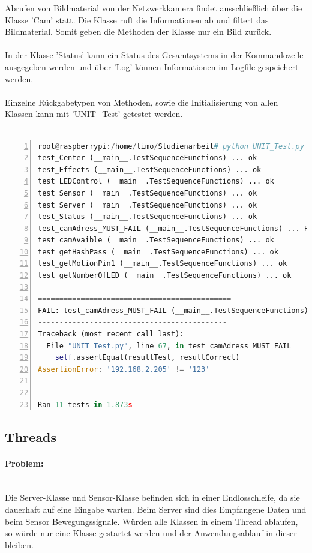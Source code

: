 Abrufen von Bildmaterial von der Netzwerkkamera findet ausschließlich über die Klasse 'Cam' statt. Die Klasse ruft die Informationen ab und filtert das Bildmaterial. Somit geben die Methoden der Klasse nur ein Bild zurück. \\\\
In der Klasse 'Status' kann ein Status des Gesamtsystems in der Kommandozeile ausgegeben werden und über 'Log' können Informationen im Logfile gespeichert werden. \\\\
Einzelne Rückgabetypen von Methoden, sowie die Initialisierung von allen Klassen kann mit 'UNIT\_Test' getestet werden. \\\\

\begin{lstlisting}[caption=Ausgabe der Klasse UNIT\_Test, language=python, frame=single, breaklines=true,columns=fullflexible, commentstyle=\color{gray}\upshape, captionpos=b, numbers = left]
root@raspberrypi:/home/timo/Studienarbeit# python UNIT_Test.py 
test_Center (__main__.TestSequenceFunctions) ... ok
test_Effects (__main__.TestSequenceFunctions) ... ok
test_LEDControl (__main__.TestSequenceFunctions) ... ok
test_Sensor (__main__.TestSequenceFunctions) ... ok
test_Server (__main__.TestSequenceFunctions) ... ok
test_Status (__main__.TestSequenceFunctions) ... ok
test_camAdress_MUST_FAIL (__main__.TestSequenceFunctions) ... FAIL
test_camAvaible (__main__.TestSequenceFunctions) ... ok
test_getHashPass (__main__.TestSequenceFunctions) ... ok
test_getMotionPin1 (__main__.TestSequenceFunctions) ... ok
test_getNumberOfLED (__main__.TestSequenceFunctions) ... ok

=============================================
FAIL: test_camAdress_MUST_FAIL (__main__.TestSequenceFunctions)
--------------------------------------------
Traceback (most recent call last):
  File "UNIT_Test.py", line 67, in test_camAdress_MUST_FAIL
    self.assertEqual(resultTest, resultCorrect)
AssertionError: '192.168.2.205' != '123'

--------------------------------------------
Ran 11 tests in 1.873s
\end{lstlisting}
\subsection{Threads}
\paragraph{Problem:} \\ Die Server-Klasse und Sensor-Klasse befinden sich in einer Endlosschleife, da sie dauerhaft auf eine Eingabe warten. Beim Server sind dies Empfangene Daten und beim Sensor Bewegungssignale. Würden alle Klassen in einem Thread ablaufen, so würde nur eine Klasse gestartet werden und der Anwendungsablauf in dieser bleiben. 
